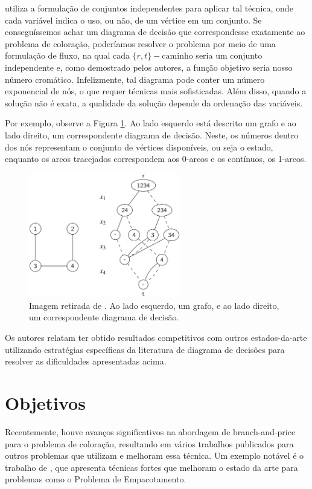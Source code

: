 \documentclass[11pt]{article}
\begin{document}
\textcite{Hoeve2021Graphcoloringdecision} utiliza a formulação de conjuntos independentes para aplicar tal técnica, onde cada variável indica o uso, ou não, de um vértice em um conjunto.
Se conseguíssemos achar um diagrama de decisão que correspondesse exatamente ao problema de coloração, poderíamos resolver o problema por meio de uma formulação de fluxo, na qual cada \(\{r,t\}-\text{caminho}\) seria um conjunto independente e, como demostrado pelos autores, a função objetivo seria nosso número cromático.
Infelizmente, tal diagrama pode conter um número exponencial de nós, o que requer técnicas mais sofisticadas.
Além disso, quando a solução não é exata, a qualidade da solução depende da ordenação das variáveis.

Por exemplo, observe a Figura \ref{fig:diagrama_decisão}.
Ao lado esquerdo está descrito um grafo e ao lado direito, um correspondente diagrama de decisão.
Neste, os números dentro dos nós representam o conjunto de vértices disponíveis, ou seja o estado, enquanto os arcos tracejados correspondem aos 0-arcos e os contínuos, os 1-arcos.

\begin{figure}[htbp]
\centering
\includegraphics[width=250px]{./diagrama_decisao.png}
\caption{\label{fig:diagrama_decisão}Imagem retirada de \autocite{Hoeve2021Graphcoloringdecision}. Ao lado esquerdo, um grafo, e ao lado direito, um correspondente diagrama de decisão.}
\end{figure}

Os autores relatam ter obtido resultados competitivos com outros estados-da-arte utilizando estratégias específicas da literatura de diagrama de decisões para resolver as dificuldades apresentadas acima.

\section{Objetivos}
\label{sec:org26f3f3a}
Recentemente, houve avanços significativos na abordagem de branch-and-price para o problema de coloração, resultando em vários trabalhos publicados para outros problemas que utilizam e melhoram essa técnica. Um exemplo notável é o trabalho de \textcite{Lima2022Exactsolutionnetwork}, que apresenta técnicas fortes que melhoram o estado da arte para problemas como o Problema de Empacotamento.
\end{document}
